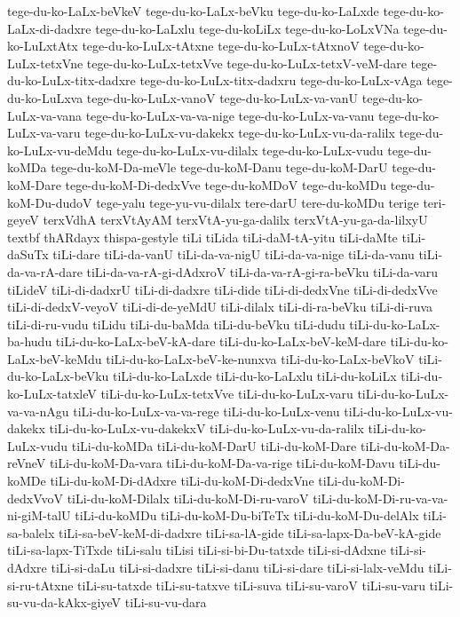 {tege-du-ko-LaLx-beVkeV
tege-du-ko-LaLx-beVku
tege-du-ko-LaLxde
tege-du-ko-LaLx-di-dadxre
tege-du-ko-LaLxlu
tege-du-koLiLx
tege-du-ko-LoLxVNa
tege-du-ko-LuLxtAtx
tege-du-ko-LuLx-tAtxne
tege-du-ko-LuLx-tAtxnoV
tege-du-ko-LuLx-tetxVne
tege-du-ko-LuLx-tetxVve
tege-du-ko-LuLx-tetxV-veM-dare
tege-du-ko-LuLx-titx-dadxre
tege-du-ko-LuLx-titx-dadxru
tege-du-ko-LuLx-vAga
tege-du-ko-LuLxva
tege-du-ko-LuLx-vanoV
tege-du-ko-LuLx-va-vanU
tege-du-ko-LuLx-va-vana
tege-du-ko-LuLx-va-va-nige
tege-du-ko-LuLx-va-vanu
tege-du-ko-LuLx-va-varu
tege-du-ko-LuLx-vu-dakekx
tege-du-ko-LuLx-vu-da-ralilx
tege-du-ko-LuLx-vu-deMdu
tege-du-ko-LuLx-vu-dilalx
tege-du-ko-LuLx-vudu
tege-du-koMDa
tege-du-koM-Da-meVle
tege-du-koM-Danu
tege-du-koM-DarU
tege-du-koM-Dare
tege-du-koM-Di-dedxVve
tege-du-koMDoV
tege-du-koMDu
tege-du-koM-Du-dudoV
tege-yalu
tege-yu-vu-dilalx
tere-darU
tere-du-koMDu
terige
teri-geyeV
terxVdhA
terxVtAyAM
terxVtA-yu-ga-dalilx
terxVtA-yu-ga-da-lilxyU
textbf
thARdayx
thispa-gestyle
tiLi
tiLida
tiLi-daM-tA-yitu
tiLi-daMte
tiLi-daSuTx
tiLi-dare
tiLi-da-vanU
tiLi-da-va-nigU
tiLi-da-va-nige
tiLi-da-vanu
tiLi-da-va-rA-dare
tiLi-da-va-rA-gi-dAdxroV
tiLi-da-va-rA-gi-ra-beVku
tiLi-da-varu
tiLideV
tiLi-di-dadxrU
tiLi-di-dadxre
tiLi-dide
tiLi-di-dedxVne
tiLi-di-dedxVve
tiLi-di-dedxV-veyoV
tiLi-di-de-yeMdU
tiLi-dilalx
tiLi-di-ra-beVku
tiLi-di-ruva
tiLi-di-ru-vudu
tiLidu
tiLi-du-baMda
tiLi-du-beVku
tiLi-dudu
tiLi-du-ko-LaLx-ba-hudu
tiLi-du-ko-LaLx-beV-kA-dare
tiLi-du-ko-LaLx-beV-keM-dare
tiLi-du-ko-LaLx-beV-keMdu
tiLi-du-ko-LaLx-beV-ke-nunxva
tiLi-du-ko-LaLx-beVkoV
tiLi-du-ko-LaLx-beVku
tiLi-du-ko-LaLxde
tiLi-du-ko-LaLxlu
tiLi-du-koLiLx
tiLi-du-ko-LuLx-tatxleV
tiLi-du-ko-LuLx-tetxVve
tiLi-du-ko-LuLx-varu
tiLi-du-ko-LuLx-va-va-nAgu
tiLi-du-ko-LuLx-va-va-rege
tiLi-du-ko-LuLx-venu
tiLi-du-ko-LuLx-vu-dakekx
tiLi-du-ko-LuLx-vu-dakekxV
tiLi-du-ko-LuLx-vu-da-ralilx
tiLi-du-ko-LuLx-vudu
tiLi-du-koMDa
tiLi-du-koM-DarU
tiLi-du-koM-Dare
tiLi-du-koM-Da-reVneV
tiLi-du-koM-Da-vara
tiLi-du-koM-Da-va-rige
tiLi-du-koM-Davu
tiLi-du-koMDe
tiLi-du-koM-Di-dAdxre
tiLi-du-koM-Di-dedxVne
tiLi-du-koM-Di-dedxVvoV
tiLi-du-koM-Dilalx
tiLi-du-koM-Di-ru-varoV
tiLi-du-koM-Di-ru-va-va-ni-giM-talU
tiLi-du-koMDu
tiLi-du-koM-Du-biTeTx
tiLi-du-koM-Du-delAlx
tiLi-sa-balelx
tiLi-sa-beV-keM-di-dadxre
tiLi-sa-lA-gide
tiLi-sa-lapx-Da-beV-kA-gide
tiLi-sa-lapx-TiTxde
tiLi-salu
tiLisi
tiLi-si-bi-Du-tatxde
tiLi-si-dAdxne
tiLi-si-dAdxre
tiLi-si-daLu
tiLi-si-dadxre
tiLi-si-danu
tiLi-si-dare
tiLi-si-lalx-veMdu
tiLi-si-ru-tAtxne
tiLi-su-tatxde
tiLi-su-tatxve
tiLi-suva
tiLi-su-varoV
tiLi-su-varu
tiLi-su-vu-da-kAkx-giyeV
tiLi-su-vu-dara
}
